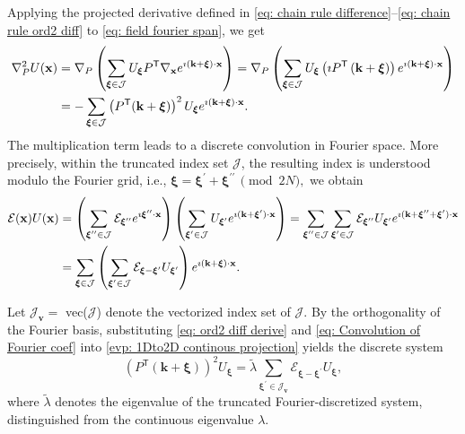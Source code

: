 \documentclass[11pt]{article}
\def\v{\mathbf{v}}
\numberwithin{equation}{section}
\begin{document}
Applying the projected derivative defined in \eqref{eq: chain rule difference}--\eqref{eq: chain rule ord2 diff} to \eqref{eq: field fourier span}, we get
\begin{align} \label{eq: ord2 diff derive}
    \nabla_{P}^{2} U(\mathbf{x}) &= \nabla_{P} \left( \sum_{\boldsymbol{\xi} \in \mathcal{J}} U_{\boldsymbol{\xi}} P^{\mathsf{T}} \nabla_{\mathbf{x}} e^{\imath (\mathbf{k}+\boldsymbol{\xi}) \cdot \mathbf{x}} \right) \notag  = \nabla_{P} \left( \sum_{\boldsymbol{\xi} \in \mathcal{J}} U_{\boldsymbol{\xi}} \left( \imath P^{\mathsf{T}} \left(\mathbf{k}+\boldsymbol{\xi}\right) \right) e^{\imath(\mathbf{k}+\boldsymbol{\xi}) \cdot \mathbf{x}} \right) \notag \\
    &= -\sum_{\boldsymbol{\xi} \in \mathcal{J}} \left( P^{\mathsf{T}} (\mathbf{k}+\boldsymbol{\xi}) \right)^{2} U_{\boldsymbol{\xi}} e^{\imath(\mathbf{k}+\boldsymbol{\xi}) \cdot \mathbf{x}}.
\end{align}
The multiplication term leads to a discrete convolution in Fourier space. More precisely, within the truncated index set $\mathcal{J}$, the resulting index is understood modulo the Fourier grid, i.e., $\boldsymbol{\xi} = \boldsymbol{\xi}^\prime + \boldsymbol{\xi}^{\prime\prime}
\,  \pmod{2N},$ we obtain
\begin{align} \label{eq: Convolution of Fourier coef}
\mathcal{E}(\mathbf{x}) U(\mathbf{x})
&=
\left(
\sum_{\boldsymbol{\xi}^{\prime \prime} \in \mathcal{J}} \mathcal{E}_{\boldsymbol{\xi}^{\prime \prime}} e^{\imath \boldsymbol{\xi}^{\prime \prime} \cdot \mathbf{x}}
\right)
\left(
\sum_{\boldsymbol{\xi}^{\prime} \in \mathcal{J}} U_{\boldsymbol{\xi}^{\prime}} e^{\imath (\mathbf{k} + \boldsymbol{\xi}^{\prime}) \cdot \mathbf{x}}
\right) \notag =
\sum_{\boldsymbol{\xi}^{\prime \prime} \in \mathcal{J}} \sum_{\boldsymbol{\xi}^{\prime} \in \mathcal{J}}\mathcal{E}_{\boldsymbol{\xi}^{\prime \prime}}U_{\boldsymbol{\xi}^{\prime}} e^{\imath (\mathbf{k} + \boldsymbol{\xi}^{\prime \prime} + \boldsymbol{\xi}^{\prime}) \cdot \mathbf{x}} \notag \\
&=
\sum_{\boldsymbol{\xi} \in \mathcal{J}}
\left(
\sum_{\boldsymbol{\xi}^{\prime} \in \mathcal{J}}
\mathcal{E}_{\boldsymbol{\xi} - \boldsymbol{\xi}^{\prime}} U_{\boldsymbol{\xi}^{\prime}}
\right)
e^{\imath (\mathbf{k} + \boldsymbol{\xi}) \cdot \mathbf{x}}.
\end{align}

Let $\mathcal{J}_\v = $ vec($\mathcal{J}$) denote the vectorized index set of $\mathcal{J}$. By the orthogonality of the Fourier basis, substituting \eqref{eq: ord2 diff derive} and \eqref{eq: Convolution of Fourier coef} into \eqref{evp: 1Dto2D continous projection}  yields the discrete system
\begin{equation} \label{df: Spectral projection term}
\left( P^\mathsf{T} (\mathbf{k} + \boldsymbol{\xi}) \right)^2 U_{\boldsymbol{\xi}}
=
\widetilde{\lambda}
\sum_{\boldsymbol{\xi}^{\prime} \in \mathcal{J}_\v}
\mathcal{E}_{\boldsymbol{\xi} - \boldsymbol{\xi}^{\prime}} U_{\boldsymbol{\xi}},
\end{equation}
where $\widetilde{\lambda}$ denotes the eigenvalue of the truncated Fourier-discretized system, distinguished from the continuous eigenvalue $\lambda$.
\end{document}
